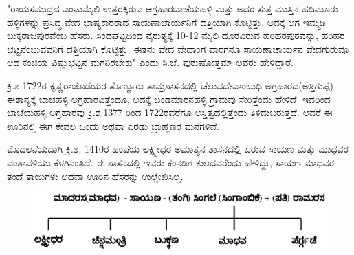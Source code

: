 "ರಾಯಸಮುದ್ರದ ಎಂಟುಮೈಲಿ ಉತ್ತರಕ್ಕಿರುವ ಅಗ್ರಹಾರಬಾಚೆಯಹಳ್ಳಿ ಮತ್ತು ಅದರ ಸುತ್ತ ಮುತ್ತಿನ ಹದಿಮೂರು ಹಳ್ಳಿಗಳನ್ನು ಪ್ರಸಿದ್ಧ ವೇದ ಭಾಷ್ಯಕಾರರಾದ ಸಾಯಣಾಚಾರ್ಯನಿಗೆ ದತ್ತಿಯಾಗಿ ಕೊಟ್ಟಿತ್ತು, ಅದಕ್ಕೆ ಆಗ ಇಮ್ಮಡಿ ಬುಕ್ಕರಾಜಪುರ\-ವೆಂಬ ಹೆಸರು. ಸಿಂದಘಟ್ಟದಿಂದ ನೈರುತ್ಯಕ್ಕೆ 10-12 ಮೈಲಿ ದೂರವಿರುವ ಹರಿಹರಪುರವನ್ನು, ಹರಿಹರ ಭಟ್ಟನೆಂಬುವವನಿಗೆ ದತ್ತಿಯಾಗಿ ಕೊಟ್ಟಿತ್ತು. ಈತನು ವೇದ ವೇದಾಂಗ ಪಾರಗನೂ ಸಾಯಣಾಚಾರ್ಯನ ವೇದಗುರುವೂ ಆದ ಕಂಚಿಯ ವಿಷ್ಣುಭಟ್ಟನ ಮಗನಿರಬೇಕು" ಎಂದು ಸಿ.ಜೆ. ಪುರುಷೋತ್ತಮ್ ಅವರು ಹೇಳಿದ್ದಾರೆ.

ಕ್ರಿ.ಶ.1722ರ ಕೃಷ್ಣರಾಜೊಡೆಯರ ತೊಣ್ಣೂರು ತಾಮ್ರಶಾಸನದಲ್ಲಿ ಚೆಲುವದೇವಾಂಬುಧಿ ಅಗ್ರಹಾರದ(ಅತ್ತಿಗುಪ್ಪೆ) ಈಶಾನ್ಯಕ್ಕೆ ಬಾಚಹಳ್ಳಿ ಅಗ್ರಹಾರವಿತ್ತೆಂದೂ, ಅದಕ್ಕೆ ಬಂಡಮಾರನಹಳ್ಳಿ ಗ್ರಾಮವು ಸೇರಿತ್ತೆಂದು ಹೇಳಿದೆ. ಇದರಿಂದ ಬಾಚೆಯಹಳ್ಳಿ ಅಗ್ರಹಾರವು ಕ್ರಿ.ಶ.1377 ರಿಂದ 1722ರವರೆಗೂ ಅಸ್ತಿತ್ವದಲ್ಲಿತ್ತೆಂದು ತಿಳಿದುಬರುತ್ತದೆ. ಆದರೆ ಈ ಊರಿನಲ್ಲಿ ಈಗ ಕೇವಲ ಒಂದು ಅಥವಾ ಎರಡು ಬ್ರಾಹ್ಮಣರ ಮನೆಗಳಿವೆ.

ಮೊದಲನೆಯದಾಗಿ ಕ್ರಿ.ಶ. 1410ರ ಹಂಪೆಯ ಲಕ್ಷ್ಮೀಧರ ಅಮಾತ್ಯನ ಶಾಸನದಲ್ಲಿ ಬರುವ ಸಾಯಣ ಮತ್ತು ಮಾಧವರ ವಂಶಾವಳಿಯು ಕೆಳಗಿನಂತಿದೆ. ಈ ಶಾಸನದಲ್ಲಿ ಇವರು ಕಂನಡಿಗ ಕುಲದವರೆಂದು ಹೇಳಿದ್ದು, ಸಾಯಣ ಮಾಧವರ ತಂದೆ ತಾಯಿಗಳು ಅಥವಾ ಊರಿನ ಹೆಸರನ್ನು ಉಲ್ಲೇಖಿಸಿಲ್ಲ.

\begin{figure}[H]
\includegraphics[scale=1.1]{images/chap4/add-chap4fig3.jpeg}
\end{figure}

